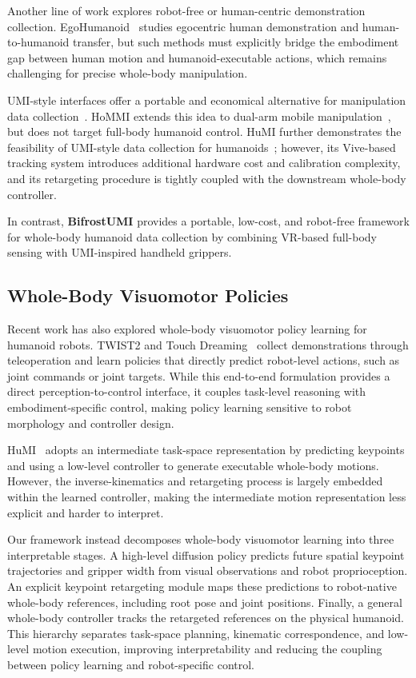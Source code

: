 \documentclass[letterpaper, 10 pt, conference]{ieeeconf}  %
\begin{document}
Another line of work explores robot-free or human-centric demonstration collection.
EgoHumanoid~\cite{egohumanoid} studies egocentric human demonstration and human-to-humanoid transfer, but such methods must explicitly bridge the embodiment gap between human motion and humanoid-executable actions, which remains challenging for precise whole-body manipulation.

UMI-style interfaces offer a portable and economical alternative for manipulation data collection~\cite{umi}.
HoMMI extends this idea to dual-arm mobile manipulation~\cite{hommi}, but does not target full-body humanoid control.
HuMI further demonstrates the feasibility of UMI-style data collection for humanoids~\cite{humi}; however, its Vive-based tracking system introduces additional hardware cost and calibration complexity, and its retargeting procedure is tightly coupled with the downstream whole-body controller.

In contrast, \textbf{BifrostUMI} provides a portable, low-cost, and robot-free framework for whole-body humanoid data collection by combining VR-based full-body sensing with UMI-inspired handheld grippers.

\subsection{Whole-Body Visuomotor Policies}

Recent work has also explored whole-body visuomotor policy learning for humanoid robots.
TWIST2 and Touch Dreaming~\cite{twist2,dreamtouch} collect demonstrations through teleoperation and learn policies that directly predict robot-level actions, such as joint commands or joint targets.
While this end-to-end formulation provides a direct perception-to-control interface, it couples task-level reasoning with embodiment-specific control, making policy learning sensitive to robot morphology and controller design.

HuMI~\cite{humi} adopts an intermediate task-space representation by predicting keypoints and using a low-level controller to generate executable whole-body motions.
However, the inverse-kinematics and retargeting process is largely embedded within the learned controller, making the intermediate motion representation less explicit and harder to interpret.

Our framework instead decomposes whole-body visuomotor learning into three interpretable stages.
A high-level diffusion policy predicts future spatial keypoint trajectories and gripper width from visual observations and robot proprioception.
An explicit keypoint retargeting module maps these predictions to robot-native whole-body references, including root pose and joint positions.
Finally, a general whole-body controller tracks the retargeted references on the physical humanoid.
This hierarchy separates task-space planning, kinematic correspondence, and low-level motion execution, improving interpretability and reducing the coupling between policy learning and robot-specific control.
\end{document}
